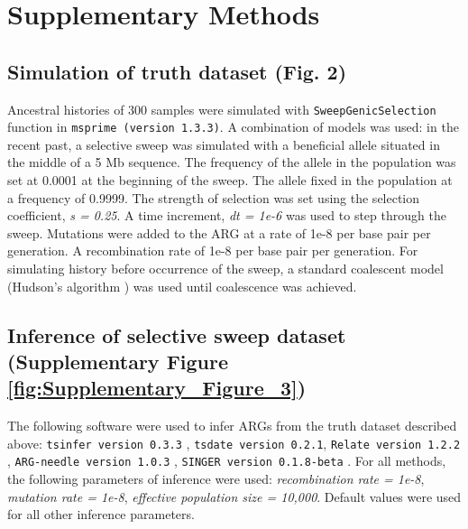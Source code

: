 \documentclass[unnumsec,webpdf,contemporary,large,namedate]{oup-authoring-template}
\begin{document}
\renewcommand{\figurename}{Fig. S}
\section{Supplementary Methods}
\subsection{Simulation of truth dataset (Fig. 2)}
\label{subsec:sweep_simulation}
Ancestral
histories of 300 samples were simulated with \texttt{SweepGenicSelection}
function in \texttt{msprime (version 1.3.3)}. A combination of models was used:
in the recent past, a selective sweep was simulated with a beneficial allele
situated in the middle of a 5 Mb sequence. The frequency of the allele in the
population was set at 0.0001 at the beginning of the sweep. The allele fixed in
the population at a frequency of 0.9999. The strength of selection was set
using the selection coefficient, \textit{s = 0.25}. A time increment,
\textit{dt = 1e-6} was used to step through the sweep. Mutations were added to
the ARG at a rate of 1e-8 per base pair per generation. A recombination rate of 
1e-8 per base pair per generation. For simulating history before occurrence of the
sweep, a standard coalescent model (Hudson's algorithm \citep{Hudson1983}) was
used until coalescence was achieved.

\subsection{Inference of selective sweep dataset (Supplementary Figure
   \ref{fig:Supplementary_Figure_3})} The following software were used to infer
ARGs from the truth dataset described above: \texttt{tsinfer version 0.3.3}
\citep{kelleher2019inferring}, \texttt{tsdate version 0.2.1}, 
\texttt{Relate version 1.2.2} \citep{speidel2019method}, 
\texttt{ARG-needle version 1.0.3} \citep{zhang2023biobank},
\texttt{SINGER version 0.1.8-beta} \citep{deng2024robust}.
For all
methods, the following parameters of inference were used: \textit{recombination
    rate = 1e-8}, \textit{mutation rate = 1e-8}, \textit{effective population size
    = 10,000}. Default values were used for all other inference parameters.
\end{document}
